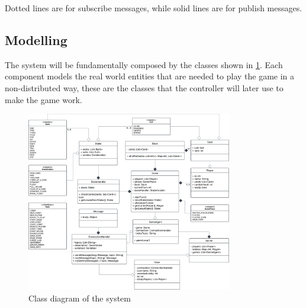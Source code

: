 \documentclass{scrartcl}
\begin{document}
Dotted lines are for subscribe messages, while solid lines are for publish messages. \newline

\subsection{Modelling}\label{modelling}

The system will be fundamentally composed by the classes shown in \cref{fig:classes}. \newline
Each component models the real world entities that are needed to play the game in a non-distributed
way, these are the classes that the controller will later use to make the game work.
\begin{figure}[H]
      \centering
      \includegraphics[width=0.8\textwidth]{figures/classes.png}
      \caption{Class diagram of the system}
      \label{fig:classes}
\end{figure}
\end{document}
